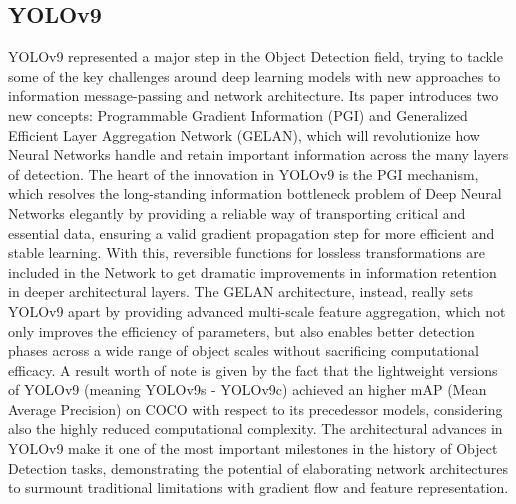 \subsection{YOLOv9}
YOLOv9 represented a major step in the Object Detection field, trying to tackle some of the key challenges around deep learning models with new approaches to information message-passing and network architecture. Its paper introduces two new concepts: Programmable Gradient Information (PGI) and Generalized Efficient Layer Aggregation Network (GELAN), which will revolutionize how Neural Networks handle and retain important information across the many layers of detection.
The heart of the innovation in YOLOv9 is the PGI mechanism, which resolves the long-standing information bottleneck problem of Deep Neural Networks elegantly by providing a reliable way of transporting critical and essential data, ensuring a valid gradient propagation step for more efficient and stable learning. With this, reversible functions for lossless transformations are included in the Network to get dramatic improvements in information retention in deeper architectural layers.
The GELAN architecture, instead, really sets YOLOv9 apart by providing advanced multi-scale feature aggregation, which not only improves the efficiency of parameters, but also enables better detection phases across a wide range of object scales without sacrificing computational efficacy. A result worth of note is given by the fact that the lightweight versions of YOLOv9 (meaning YOLOv9s - YOLOv9c) achieved an higher mAP (Mean Average Precision) on COCO with respect to its precedessor models, considering also the highly reduced computational complexity.
The architectural advances in YOLOv9 make it one of the most important milestones in the history of Object Detection tasks, demonstrating the potential of elaborating network architectures to surmount traditional limitations with gradient flow and feature representation.

